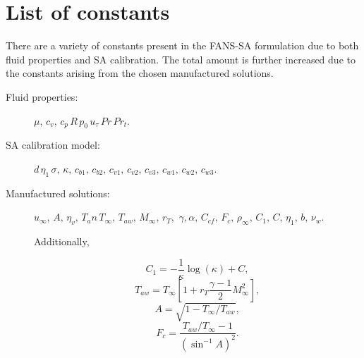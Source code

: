 \section{List of constants}

There are a variety of constants present in the FANS-SA formulation due to both fluid properties and SA calibration. The total amount is further increased due to the constants arising from the chosen manufactured solutions.

\begin{description}
	\item[Fluid properties:] $\mu, \,c_v, \, c_p \, R \, p_0 \, u_{\tau} \, Pr \, Pr_t$.

\item[SA calibration model:] $d \, \eta_1 \,  \sigma, \, \kappa, \, c_{b1}, \, c_{b2}, \, c_{v1}, \, c_{v2}, \, c_{v3}, \, c_{w1}, \, c_{w2}, \, c_{w3}$.

\item[Manufactured solutions:] $u_\infty, \, A, \, \eta_v, \, T_an \, T_\infty, \, T_{aw},\, M_\infty, \, r_T,$  $\gamma, %
\alpha, \, C_{cf}, \, F_c, \, \rho_\infty, \, C_1, \, C,\, \eta_1, \, b, \, \nu_w$.

Additionally, 


$$C_1=-\dfrac{1}{\kappa} \log(\kappa)+C,$$%
$$T_{aw} =  T_{\infty} \left[ 1 + r_T \frac{\gamma - 1}{2} M_{\infty}^2 \right],$$
$$A = \sqrt{1 - T_{\infty}/T_{aw}},$$
$$ F_c = \frac{T_{aw}/T_{\infty} - 1}{ \left( \sin^{-1} A \right)^2} .$$
\end{description}
